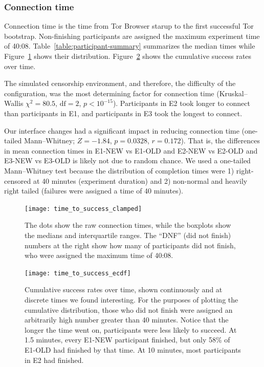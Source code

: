 \documentclass[USenglish,oneside,twocolumn]{article}
\begin{document}
\subsubsection{Connection time} 
Connection time is the time from Tor Browser starup to the first successful Tor bootstrap. Non-finishing participants are assigned the maximum experiment time of 40:08. Table~\ref{table:participant-summary} summarizes the median times while Figure~\ref{fig:time_to_success_clamped} shows their distribution. Figure~\ref{fig:time_to_success_ecdf} shows the cumulative success rates over time. 

The simulated censorship environment, and therefore, the difficulty of the configuration, was the most determining factor for connection time (Kruskal--Wallis $\chi^2 = 80.5$, $\mbox{df} = 2$, $p < 10^{-15}$). Participants in E2 took longer to connect than participants in E1, and participants in E3 took the longest to connect.

Our interface changes had a significant impact in reducing connection time (one-tailed Mann--Whitney; $ Z = -1.84$, $p = 0.0328$, $r= 0.172$). That is, the differences in mean connection times in E1-NEW vs E1-OLD and E2-NEW vs E2-OLD and E3-NEW vs E3-OLD is likely not due to random chance. We used a one-tailed Mann--Whitney test because the distribution of completion times were 1) right-censored at 40 minutes (experiment duration) and 2) non-normal and heavily right tailed (failures were assigned a time of 40 minutes). 

\begin{figure}[t]
\centering
\texttt{[image: time\_to\_success\_clamped]}
\caption{
The dots show the raw connection times,
while the boxplots show the medians and interquartile ranges.
The ``DNF'' (did not finish) numbers at the right show how many of participants 
did not finish, who were assigned the maximum time of 40:08.
}
\label{fig:time_to_success_clamped}
\end{figure}

\begin{figure}[t]
\centering
\texttt{[image: time\_to\_success\_ecdf]}

\caption{
Cumulative success rates over time, shown continuously and at discrete times we found interesting.
For the purposes of plotting the cumulative distribution, those who did not finish were assigned
an arbitrarily high number greater than 40 minutes. 
Notice that the longer the time went on, participants were less likely to succeed. 
At 1.5 minutes, every E1-NEW participant finished,
but only 58\% of E1-OLD had finished by that time.  
At 10 minutes, most participants in E2 had finished. 
}
\label{fig:time_to_success_ecdf}
\end{figure}
\end{document}
